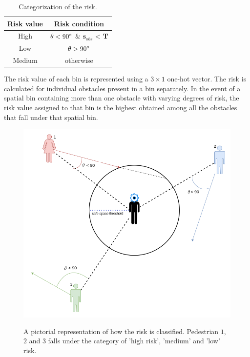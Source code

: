 \begin{table}[htbp]
    \caption{Categorization of the risk.}
    \label{risk-categorization-table}
    \begin{center}
        \renewcommand{\arraystretch}{1.3}
        \begin{tabular}{|c|c|}
            \hline
            Risk value & Risk condition \\
            \hline
            High & $\theta < 90\degree$ \&  $\mathbf{s}_{obs}$ < $\mathbf{T}$   \\
            
            Low & $\theta > 90\degree$\\
            
            Medium & otherwise \\
            \hline
        \end{tabular}
    \end{center}
\end{table}
The risk value of each bin is represented using a $3 \times 1$ one-hot vector. The risk is calculated for individual obstacles present in a bin separately. In the event of a spatial bin containing more than one obstacle with varying degrees of risk, the risk value assigned to that bin is the highest obtained among all the obstacles that fall under that spatial bin.
\begin{figure}[!htbp]
	\centering
	\includegraphics[width=.8\linewidth]{figures/risk_picture.png}
    \label{fig:risk-calculation}
    \caption{A pictorial representation of how the risk is classified. Pedestrian $1$, $2$ and $3$ falls under the category of 'high risk', 'medium' and 'low' risk.}
\end{figure}


